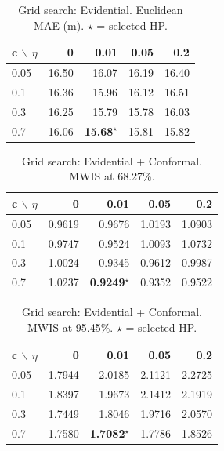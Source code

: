 \begin{table}[t]
\centering
\caption{Grid search: Evidential. Euclidean MAE (m). $\star$ = selected HP.}
\label{tab:supp:gridsearch_mae}
\begin{tabular}{lrrrr}
\toprule
c $\backslash$ $\eta$ & 0 & 0.01 & 0.05 & 0.2 \\
\midrule
0.05 & 16.50 & 16.07 & 16.19 & 16.40 \\
0.1 & 16.36 & 15.96 & 16.12 & 16.51 \\
0.3 & 16.25 & 15.79 & 15.78 & 16.03 \\
0.7 & 16.06 & \textbf{15.68}$^{\star}$ & 15.81 & 15.82 \\
\bottomrule
\end{tabular}
\end{table}
\begin{table}[t]
\centering
\caption{Grid search: Evidential + Conformal. MWIS at 68.27\%.}
\label{tab:supp:gridsearch_mwis_q6827}
\begin{tabular}{lrrrr}
\toprule
c $\backslash$ $\eta$ & 0 & 0.01 & 0.05 & 0.2 \\
\midrule
0.05 & 0.9619 & 0.9676 & 1.0193 & 1.0903 \\
0.1 & 0.9747 & 0.9524 & 1.0093 & 1.0732 \\
0.3 & 1.0024 & 0.9345 & 0.9612 & 0.9987 \\
0.7 & 1.0237 & \textbf{0.9249}$^{\star}$ & 0.9352 & 0.9522 \\
\bottomrule
\end{tabular}
\end{table}

\begin{table}[t]
\centering
\caption{Grid search: Evidential + Conformal. MWIS at 95.45\%. $\star$ = selected HP.}
\label{tab:supp:gridsearch_mwis_q9545}
\begin{tabular}{lrrrr}
\toprule
c $\backslash$ $\eta$ & 0 & 0.01 & 0.05 & 0.2 \\
\midrule
0.05 & 1.7944 & 2.0185 & 2.1121 & 2.2725 \\
0.1 & 1.8397 & 1.9673 & 2.1412 & 2.1919 \\
0.3 & 1.7449 & 1.8046 & 1.9716 & 2.0570 \\
0.7 & 1.7580 & \textbf{1.7082}$^{\star}$ & 1.7786 & 1.8526 \\
\bottomrule
\end{tabular}
\end{table}


